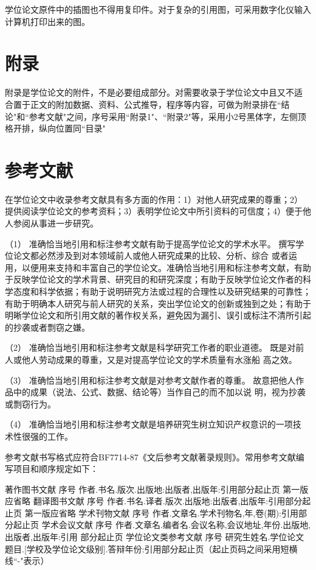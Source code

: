 学位论文原件中的插图也不得用复印件。对于复杂的引用图，可采用数字化仪输入计算机打印出来的图。

\section{附录}\label{appendixA-7}

附录是学位论文的附件，不是必要组成部分。对需要收录于学位论文中且又不适
合置于正文的附加数据、资料、公式推导，程序等内容，可做为附录排在``结论"和``参考文献"之间，序号采用``附录1"、``附录2"等，采用小2号黑体字，左侧顶格开排，纵向位置同``目录"

\section{参考文献}\label{appendixA-8}

在学位论文中收录参考文献具有多方面的作用：1）对他人研究成果的尊重；2）
提供阅读学位论文的参考资料；3）表明学位论文中所引资料的可信度；4）便于他人参阅从事进一步研究。

（1）	准确恰当地引用和标注参考文献有助于提高学位论文的学术水平。
 撰写学位论文都必然涉及到对本领域前人或他人研究成果的比较、分析、综合
或者运用，以便用来支持和丰富自己的学位论文。准确恰当地引用和标注参考文献，有助于反映学位论文的学术背景、研究目的和研究深度；有助于反映学位论文作者的科学态度和科学依据；有助于说明研究方法或过程的合理性以及研究结果的可靠性；有助于明确本人研究与前人研究的关系，突出学位论文的创新或独到之处；有助于明晰学位论文和所引用文献的著作权关系，避免因为漏引、误引或标注不清所引起的抄袭或者剽窃之嫌。

（2）	准确恰当地引用和标注参考文献是科学研究工作者的职业道德。
 既是对前人或他人劳动成果的尊重，又是对提高学位论文的学术质量有水涨船
高之效。

（3）	准确恰当地引用和标注参考文献是对参考文献作者的尊重。
故意把他人作品中的成果（说法、公式、数据、结论等）当作自己的而不加以说
明，视为抄袭或剽窃行为。

（4）	准确恰当地引用和标注参考文献是培养研究生树立知识产权意识的一项技
术性很强的工作。

    参考文献书写格式应符合BF7714-87《文后参考文献著录规则》。常用参考文献编写项目和顺序规定如下：

          著作图书文献
  序号    作者.书名.版次.出版地:出版者,出版年:引用部分起止页
                                                         第一版应省略
          翻译图书文献
  序号    作者.书名.译者.版次.出版地:出版者,出版年:引用部分起止页
                                                         第一版应省略
          学术刊物文献
  序号    作者.文章名.学术刊物名,年,卷(期):引用部分起止页
          学术会议文献
  序号    作者.文章名.编者名.会议名称,会议地址,年份.出版地,出版者,出版年:引用         部分起止页
           学位论文类参考文献
  序号    研究生姓名.学位论文题目.[学校及学位论文级别].答辩年份:引用部分起止页（起止页码之间采用短横线``-"表示）

